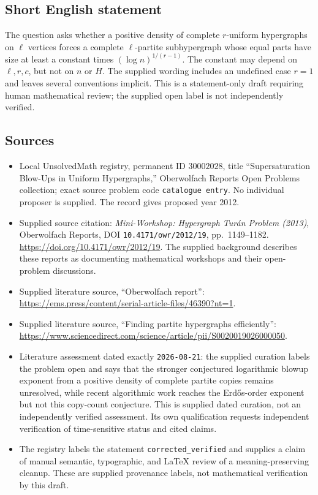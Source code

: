 \documentclass[11pt]{article}
\begin{document}
\subsection{Short English statement}
The question asks whether a positive density of complete \(r\)-uniform hypergraphs on \(\ell\) vertices forces a complete \(\ell\)-partite subhypergraph whose equal parts have size at least a constant times \((\log n)^{1/(r-1)}\). The constant may depend on \(\ell,r,c\), but not on \(n\) or \(H\). The supplied wording includes an undefined case \(r=1\) and leaves several conventions implicit. This is a statement-only draft requiring human mathematical review; the supplied open label is not independently verified.
\subsection{Sources}
\begin{itemize}
\item Local UnsolvedMath registry, permanent ID \(30002028\), title ``Supersaturation Blow-Ups in Uniform Hypergraphs,'' Oberwolfach Reports Open Problems collection; exact source problem code \texttt{catalogue entry}. No individual proposer is supplied. The record gives proposed year 2012.
\item Supplied source citation: \emph{Mini-Workshop: Hypergraph Tur\'an Problem (2013)}, Oberwolfach Reports, DOI \texttt{10.4171/owr/2012/19}, pp.\ 1149--1182. \url{https://doi.org/10.4171/owr/2012/19}. The supplied background describes these reports as documenting mathematical workshops and their open-problem discussions.
\item Supplied literature source, ``Oberwolfach report'': \url{https://ems.press/content/serial-article-files/46390?nt=1}.
\item Supplied literature source, ``Finding partite hypergraphs efficiently'': \url{https://www.sciencedirect.com/science/article/pii/S0020019026000050}.
\item Literature assessment dated exactly \texttt{2026-08-21}: the supplied curation labels the problem open and says that the stronger conjectured logarithmic blowup exponent from a positive density of complete partite copies remains unresolved, while recent algorithmic work reaches the Erd\H{o}s-order exponent but not this copy-count conjecture. This is supplied dated curation, not an independently verified assessment. Its own qualification requests independent verification of time-sensitive status and cited claims.
\item The registry labels the statement \texttt{corrected\_verified} and supplies a claim of manual semantic, typographic, and LaTeX review of a meaning-preserving cleanup. These are supplied provenance labels, not mathematical verification by this draft.
\end{itemize}
\end{document}
